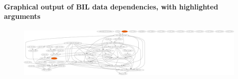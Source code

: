 \documentclass[letterpaper,11pt]{article}
\begin{document}
\paragraph{Graphical output of BIL data dependencies, with highlighted arguments}

\begin{figure}[ht!]
\centering
\includegraphics[scale=0.15, trim=0mm 0mm 780mm 0mm, clip]{img/ddep.pdf}
\end{figure}

\nocite{*}
{
}
\end{document}
